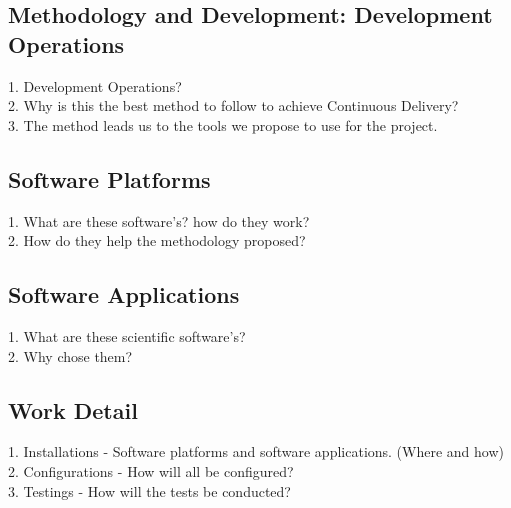 \documentclass [titlepage,11pt]{article}
\begin{document}
\subsection{Methodology and Development: Development Operations}
1. Development Operations? \\
2. Why is this the best method to follow to achieve Continuous Delivery? \\
3. The method leads us to the tools we propose to use for the project.\\

\subsection{Software Platforms}
1. What are these software's? how do they work? \\
2. How do they help the methodology proposed? \\

\subsection{Software Applications}
1. What are these scientific software's?\\
2. Why chose them? \\

\subsection{Work Detail}
1. Installations - Software platforms and software applications. (Where and how) \\
2. Configurations  - How will all be configured? \\
3. Testings - How will the tests be conducted? \\


\end{document}
